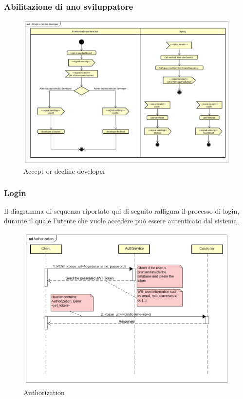 \subsubsection{Abilitazione di uno sviluppatore}
\begin{figure}[H]
\centering
\includegraphics[width=17cm, keepaspectratio]{img/Accept-or-decline-developer.png} 
\caption{Accept or decline developer}
\end{figure}

\subsubsection{Login}
Il diagramma di sequenza riportato qui di seguito raffigura il processo di login, durante il quale l'utente che vuole accedere può essere autenticato dal sistema.
\begin{figure}[H]
\centering
\includegraphics[width=17cm, keepaspectratio]{img/Authorization.png} 
\caption{Authorization}
\end{figure}

